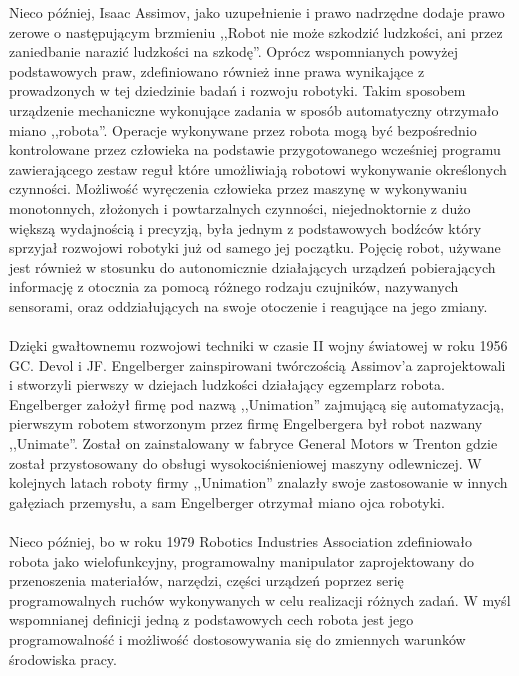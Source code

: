 Nieco później, Isaac Assimov, jako uzupełnienie i prawo nadrzędne dodaje prawo
zerowe o następującym brzmieniu ,,Robot nie może szkodzić ludzkości, ani przez
zaniedbanie narazić ludzkości na szkodę''\cite{website:robotyka-pl}. Oprócz
wspomnianych powyżej podstawowych praw, zdefiniowano również inne prawa
wynikające z prowadzonych w tej dziedzinie badań i rozwoju robotyki.
\newpage
Takim sposobem urządzenie mechaniczne wykonujące zadania w sposób automatyczny
otrzymało miano ,,robota''.\cite{website:asimo-pl} Operacje wykonywane przez
robota mogą być bezpośrednio kontrolowane przez człowieka na podstawie przygotowanego wcześniej
programu zawierającego zestaw reguł które umożliwiają robotowi wykonywanie
określonych czynności. Możliwość wyręczenia człowieka przez maszynę w
wykonywaniu monotonnych, złożonych i powtarzalnych czynności, niejednoktornie
z dużo większą wydajnością i precyzją, była jednym z podstawowych bodźców
który sprzyjał rozwojowi robotyki już od samego jej początku. Pojęcię robot,
używane jest również w stosunku do autonomicznie działających urządzeń
pobierających informację z otocznia za pomocą różnego rodzaju czujników,
nazywanych sensorami, oraz oddziałujących na swoje otoczenie i reagujące na
jego zmiany. \\
\\
Dzięki gwałtownemu rozwojowi techniki w czasie II wojny światowej w roku 1956
GC. Devol i JF. Engelberger zainspirowani twórczością Assimov'a zaprojektowali i
stworzyli pierwszy w dziejach ludzkości działający egzemplarz robota\cite{website:robotyka-pl}.
Engelberger założył firmę pod nazwą ,,Unimation'' zajmującą się automatyzacją,
pierwszym robotem stworzonym przez firmę Engelbergera był robot nazwany
,,Unimate''. Został on zainstalowany w fabryce General Motors w Trenton gdzie
został przystosowany do obsługi wysokociśnieniowej maszyny odlewniczej. W
kolejnych latach roboty firmy ,,Unimation'' znalazły swoje zastosowanie w innych
gałęziach przemysłu, a sam Engelberger otrzymał miano ojca
robotyki.\cite{website:robotyka-pl}\\
\\
Nieco później, bo w roku 1979 Robotics Industries Association 
zdefiniowało robota jako wielofunkcyjny, programowalny manipulator
zaprojektowany do przenoszenia materiałów, narzędzi, części urządzeń poprzez
serię programowalnych ruchów wykonywanych w celu realizacji różnych zadań.
W myśl wspomnianej definicji jedną z podstawowych cech robota jest jego
programowalność i możliwość dostosowywania się do zmiennych warunków środowiska
pracy. \\
